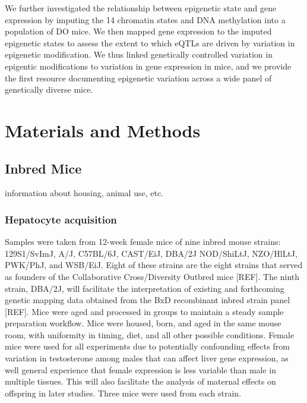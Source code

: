 \documentclass[10pt,letterpaper]{article}
\begin{document}
We further investigated the relationship between epigenetic state and
gene expression by imputing the 14 chromatin states and DNA methylation
into a population of DO mice. We then mapped gene expression to the
imputed epigenetic states to assess the extent to which eQTLs are driven
by variation in epigenetic modification. We thus linked genetically
controlled variation in epigentic modifications to variation in gene
expression in mice, and we provide the first resource documenting
epigenetic variation across a wide panel of genetically diverse mice.

\hypertarget{materials-and-methods}{%
\section{Materials and Methods}\label{materials-and-methods}}

\hypertarget{inbred-mice}{%
\subsection{Inbred Mice}\label{inbred-mice}}

information about housing, animal use, etc.

\hypertarget{hepatocyte-acquisition}{%
\subsubsection{Hepatocyte acquisition}\label{hepatocyte-acquisition}}

Samples were taken from 12-week female mice of nine inbred mouse
strains: 129S1/SvImJ, A/J, C57BL/6J, CAST/EiJ, DBA/2J NOD/ShiLtJ,
NZO/HlLtJ, PWK/PhJ, and WSB/EiJ. Eight of these strains are the eight
strains that served as founders of the Collaborative Cross/Diversity
Outbred mice {[}REF{]}. The ninth strain, DBA/2J, will facilitate the
interpretation of existing and forthcoming genetic mapping data obtained
from the BxD recombinant inbred strain panel {[}REF{]}. Mice were aged
and processed in groups to maintain a steady sample preparation
workflow. Mice were housed, born, and aged in the same mouse room, with
uniformity in timing, diet, and all other possible conditions. Female
mice were used for all experiments due to potentially confounding
effects from variation in testosterone among males that can affect liver
gene expression, as well general experience that female expression is
less variable than male in multiple tissues. This will also facilitate
the analysis of maternal effects on offspring in later studies. Three
mice were used from each strain.
\end{document}
